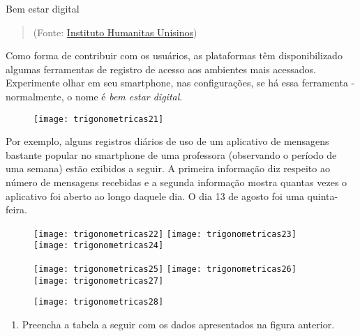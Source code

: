 \begin{task}{Bem estar digital}
\begin{quote}
\flushright
(Fonte: \href{http://www.ihu.unisinos.br/78-noticias/591422-uso-excessivo-do-celular-pode-causar-dependencia-e-problemas-psicologicos}{Instituto Humanitas Unisinos})
\end{quote}

Como forma de contribuir com os usuários, as plataformas têm disponibilizado algumas ferramentas de registro de acesso aos ambientes mais acessados. Experimente olhar em seu smartphone, nas configurações, se há essa ferramenta - normalmente, o nome é \textit{bem estar digital}.

\begin{figure}[H]
\centering

\texttt{[image: trigonometricas21]}
\end{figure}

Por exemplo, alguns registros diários de uso de um aplicativo de mensagens bastante popular no smartphone de uma professora (observando o período de uma semana) estão exibidos a seguir. A primeira informação diz respeito ao número de mensagens recebidas e a segunda informação mostra quantas vezes o aplicativo foi aberto ao longo daquele dia. O dia 13 de agosto foi uma quinta-feira.


\begin{figure}[H]
\centering

\texttt{[image: trigonometricas22]}
\texttt{[image: trigonometricas23]}
\texttt{[image: trigonometricas24]}
\end{figure}

\begin{figure}[H]
\centering

\texttt{[image: trigonometricas25]}
\texttt{[image: trigonometricas26]}
\texttt{[image: trigonometricas27]}
\end{figure}

\begin{figure}[H]
\centering

\texttt{[image: trigonometricas28]}
\end{figure}
\newpage

\begin{enumerate}
\item Preencha a tabela a seguir com os dados apresentados na figura anterior.

\begin{table}[H]
\centering


\end{table}
\end{enumerate}
\end{task}
